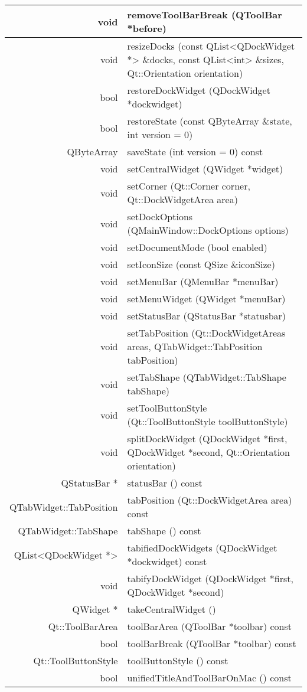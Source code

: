\begin{longtable}{|r|m{20em}|}
\hline
void 	&removeToolBarBreak (QToolBar *before) \\ 
\hline
void 	&resizeDocks (const QList<QDockWidget *> \&docks, const QList<int> \&sizes, Qt::Orientation orientation) \\ 
\hline
bool 	&restoreDockWidget (QDockWidget *dockwidget) \\ 
\hline
bool 	&restoreState (const QByteArray \&state, int version = 0) \\ 
\hline
QByteArray &	saveState (int version = 0) const \\ 
\hline
void &	setCentralWidget (QWidget *widget) \\ 
\hline
void &	setCorner (Qt::Corner corner, Qt::DockWidgetArea area) \\ 
\hline
void 	&setDockOptions (QMainWindow::DockOptions options) \\ 
\hline
void &	setDocumentMode (bool enabled) \\ 
\hline
void &	setIconSize (const QSize \&iconSize) \\ 
\hline
void &	setMenuBar (QMenuBar *menuBar) \\ 
\hline
void& 	setMenuWidget (QWidget *menuBar) \\ 
\hline
void &	setStatusBar (QStatusBar *statusbar) \\ 
\hline
void &	setTabPosition (Qt::DockWidgetAreas areas, QTabWidget::TabPosition tabPosition) \\ 
\hline
void &	setTabShape (QTabWidget::TabShape tabShape) \\ 
\hline
void 	&setToolButtonStyle (Qt::ToolButtonStyle toolButtonStyle) \\ 
\hline
void 	&splitDockWidget (QDockWidget *first, QDockWidget *second, Qt::Orientation orientation) \\ 
\hline
QStatusBar * & 	statusBar () const \\ 
\hline
QTabWidget::TabPosition &	tabPosition (Qt::DockWidgetArea area) const \\ 
\hline
QTabWidget::TabShape & 	tabShape () const \\
\hline
QList<QDockWidget *> 	&tabifiedDockWidgets (QDockWidget *dockwidget) const \\
\hline
void &	tabifyDockWidget (QDockWidget *first, QDockWidget *second) \\ 
\hline
QWidget *& 	takeCentralWidget () \\ 
\hline
Qt::ToolBarArea &	toolBarArea (QToolBar *toolbar) const \\ 
\hline
bool &	toolBarBreak (QToolBar *toolbar) const \\ 
\hline
Qt::ToolButtonStyle & 	toolButtonStyle () const \\ 
\hline
bool &	unifiedTitleAndToolBarOnMac () const \\
\hline
\end{longtable}

